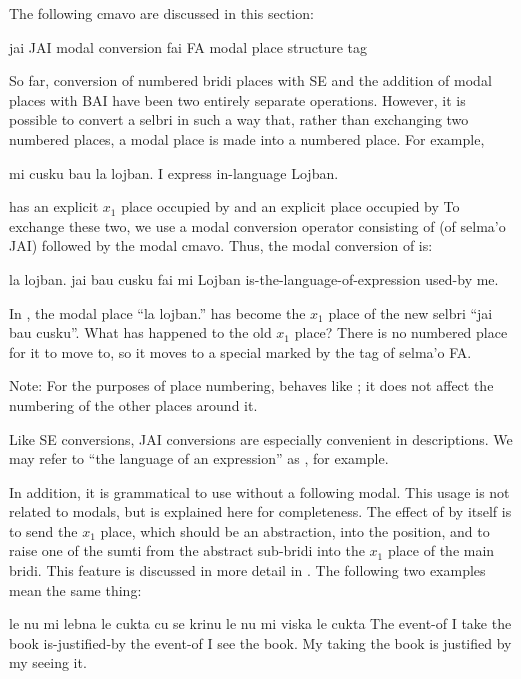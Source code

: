 The following cmavo are discussed in this section:

   jai JAI modal conversion
    fai FA  modal place structure tag

So far, conversion of numbered bridi places with SE and the
    addition of modal places with BAI have been two entirely
    separate operations. However, it is possible to convert a
    selbri in such a way that, rather than exchanging two numbered
    places, a modal place is made into a numbered place. For
    example,
\begin{example}
mi cusku bau la lojban.\n
I express  in-language Lojban.
\end{example}

{\noindent}has an explicit $x_1$ place occupied by  and an explicit
     place occupied by  To exchange these two,
    we use a modal conversion operator consisting of  (of
    selma'o JAI) followed by the modal cmavo. Thus, the modal
    conversion of  is:
\begin{example}
la lojban. jai bau cusku fai mi\n
Lojban is-the-language-of-expression used-by me.
\end{example}

In , the modal place ``la
    lojban.'' has become the $x_1$ place of the new selbri ``jai bau
    cusku''. What has happened to the old $x_1$ place? There is no
    numbered place for it to move to, so it moves to a special
     marked by the tag  of selma'o FA. 

Note: For the purposes of place numbering,  behaves
    like ; it does not affect the numbering of the other
    places around it.

Like SE conversions, JAI conversions are especially
    convenient in descriptions. We may refer to ``the language of
    an expression'' as , for example.

In addition, it is grammatical to use  without a
    following modal. This usage is not related to modals, but is
    explained here for completeness. The effect of  by
    itself is to send the $x_1$ place, which should be an abstraction,
    into the  position, and to raise one of the sumti from
    the abstract sub-bridi into the $x_1$ place of the main bridi.
    This feature is discussed in more detail in . The following two examples
    mean the same thing:
\begin{example}
le nu mi lebna le cukta\n
\T	cu se krinu le nu mi viska le cukta\n
The event-of I take the book\n
\T	is-justified-by the event-of I see the book.\n
My taking the book is justified by my seeing it.
\end{example}

